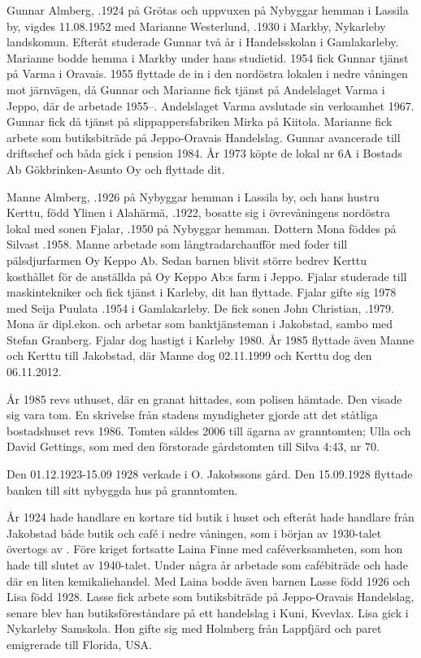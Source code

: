 Gunnar Almberg, .1924 på Grötas och uppvuxen på Nybyggar hemman i Lassila by, vigdes 11.08.1952 med Marianne Westerlund, .1930 i Markby, Nykarleby landskomun. Efteråt studerade Gunnar två år i Handelsskolan i Gamlakarleby. Marianne bodde hemma i Markby under hans studietid. 1954 fick Gunnar tjänst på Varma i Oravais. 1955 flyttade de in i den nordöstra lokalen i nedre våningen mot järnvägen, då Gunnar och Marianne fick tjänst på Andelslaget Varma i Jeppo, där de arbetade 1955--. Andelslaget Varma avslutade sin verksamhet 1967. Gunnar fick då tjänst på slippappersfabriken Mirka på Kiitola. Marianne fick arbete som butiksbiträde på Jeppo-Oravais Handelslag. Gunnar avancerade till driftschef och båda gick i pension 1984. År 1973 köpte de lokal nr 6A i Bostads Ab Gökbrinken-Asunto Oy och flyttade dit.

Manne Almberg, .1926 på Nybyggar hemman i Lassila by, och hans hustru Kerttu, född Ylinen i Alahärmä, .1922, bosatte sig i övrevåningens nordöstra lokal med sonen Fjalar, .1950 på Nybyggar hemman. Dottern Mona föddes på Silvast .1958. Manne arbetade som långtradarchaufför med foder till pälsdjurfarmen Oy Keppo Ab. Sedan barnen blivit större bedrev Kerttu kosthållet för de anställda på Oy Keppo Ab:s farm i Jeppo.  Fjalar studerade till maskintekniker och fick tjänst i Karleby, dit han flyttade. Fjalar gifte sig 1978 med Seija Puulata .1954 i Gamlakarleby. De fick sonen John Christian, .1979. Mona är dipl.ekon. och arbetar som banktjänsteman i Jakobstad, sambo med Stefan Granberg. Fjalar dog hastigt i Karleby 1980. År 1985 flyttade även Manne och Kerttu till Jakobstad, där Manne dog 02.11.1999 och Kerttu dog den 06.11.2012.

År 1985 revs uthuset, där en granat hittades, som polisen hämtade. Den visade sig vara tom. En skrivelse från stadens myndigheter gjorde att det ståtliga bostadshuset revs 1986. Tomten såldes 2006 till ägarna av granntomten; Ulla och David Gettings, som med den förstorade gårdstomten till Silva 4:43, nr 70.




Den 01.12.1923-15.09 1928 verkade  i O. Jakobssons gård. Den 15.09.1928 flyttade banken till sitt nybyggda hus på granntomten.

År 1924 hade handlare  en kortare tid butik i huset och efteråt hade handlare  från Jakobstad både butik och café i nedre våningen, som i början av 1930-talet övertogs av . Före kriget fortsatte {Laina Finne} med caféverksamheten, som hon hade till slutet av 1940-talet. Under några år arbetade  som cafébiträde och hade där en liten kemikaliehandel. Med Laina bodde även barnen Lasse född 1926 och Lisa född 1928. Lasse fick arbete som butiksbiträde på Jeppo-Oravais Handelslag, senare blev han butiksföreståndare på ett handelslag i Kuni, Kvevlax.  Lisa gick i Nykarleby Samskola. Hon gifte sig med Holmberg från Lappfjärd och paret emigrerade till Florida, USA.

